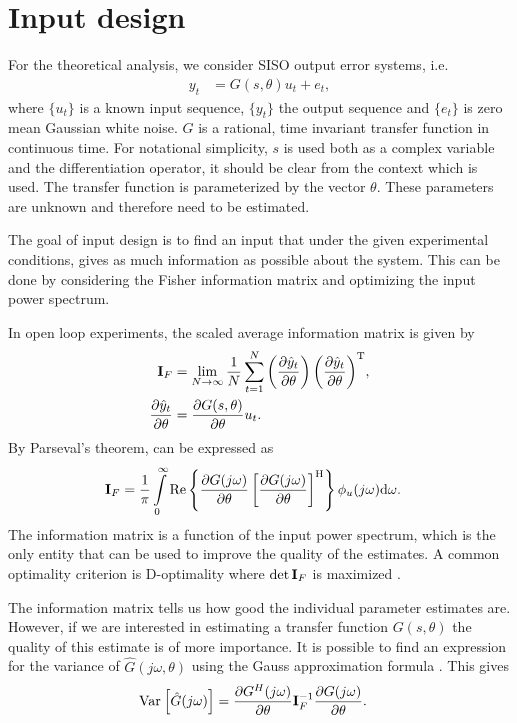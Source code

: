 \section{Input design}\label{sec:excitation:inputDesign}
For the theoretical analysis, we consider SISO output error systems, i.e.
\begin{align}
y_t &=G(s,\theta)u_t  + e_t,
\end{align}
where $\{u_t\}$ is a known input sequence, $\{y_t\}$ the output sequence and
$\{e_t\}$ is zero mean Gaussian white noise.
$G$ is a rational, time invariant transfer function in continuous time. For notational simplicity, $s$ is used both as a complex variable and the differentiation operator, it should be clear from the context which is used. The transfer function is parameterized by the vector $\theta$. These parameters are unknown and therefore need to be estimated. 

The goal of input design is to find an input that under the given experimental conditions, gives as much information as possible about the system. This can be done by considering the Fisher information matrix and optimizing the input power spectrum. 

In open loop experiments, the scaled average information matrix is given by
\begin{align}
\mathbf{I}_F & = \lim_{N\rightarrow\infty}
          \frac{1}{N}
            \sum_{t=1}^{N}
              {\left(\frac{\partial\hat{y}_t}{\partial\theta}\right)
               \left(\frac{\partial\hat{y}_t}{\partial\theta}\right)^{\mathrm{T}}},\\
\frac{\partial\hat{y}_t}{\partial\theta}
    & =\frac{\partial G(s,\theta)}{\partial \theta}u_t.
\end{align}
By Parseval's theorem, \IF can be expressed as
\begin{align}
\mathbf{I}_F &= \frac{1}{\pi}
         \int\limits_0^\infty \mathrm{Re}
           \left\{      \frac{\partial G(j\omega)}{\partial \theta}
                  \left[\frac{\partial G(j\omega)}{\partial \theta}\right]^{\mathrm{H}}
           \right\}
           \phi_u(j\omega)
           \mathrm{d}{\omega} \text{.}
\label{eq:excitation:IF}
\end{align}
The information matrix is a function of the input power spectrum, which is the only entity that can be used to improve the quality of the estimates. A common optimality criterion is D-optimality where $\det{\ensuremath{\mathbf{I}_F}}$ is maximized \citep{Goodwin1977}.

The information matrix tells us how good the individual parameter estimates are. However, if we are interested in estimating a transfer function $G(s,\theta)$ the quality of this estimate is of more importance. It is possible to find an expression for the variance of $\hat{G}(j\omega,\theta)$ using the Gauss approximation formula \citep{Ljung1999, Pintelon2012}. This gives
\begin{align}
\operatorname{\mathrm{Var}}_{} \left[ \hat{G}(j\omega) \right] &= \frac{\partial G^H(j\omega)}{\partial \theta}\mathbf{I}_F^{-1}\frac{\partial G(j\omega)}{\partial \theta}.
\label{eq:excitation:varG}
\end{align}

